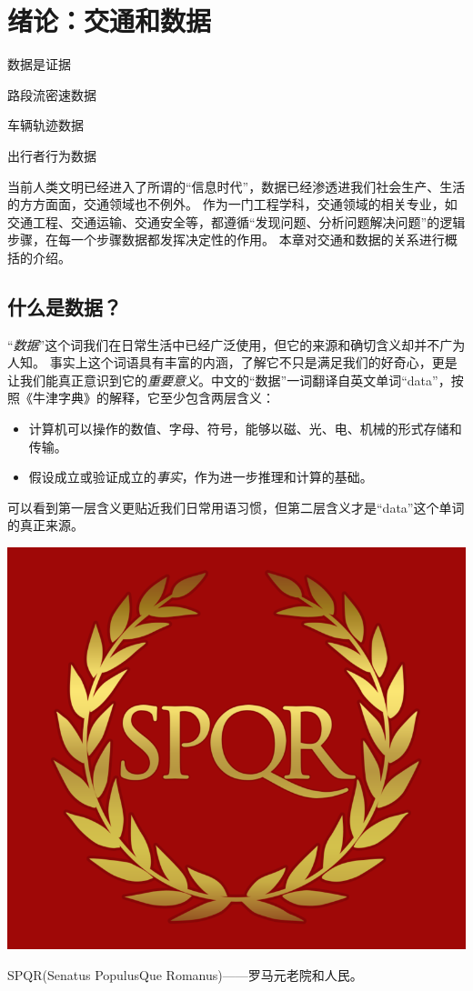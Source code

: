 
\chapter{绪论：交通和数据}
\begin{cabstract}
    \item 数据是证据
    \item 路段流密速数据
    \item 车辆轨迹数据
    \item 出行者行为数据
\end{cabstract}

当前人类文明已经进入了所谓的“信息时代”，数据已经渗透进我们社会生产、生活的方方面面，交通领域也不例外。
作为一门工程学科，交通领域的相关专业，如交通工程、交通运输、交通安全等，都遵循“发现问题、分析问题解决问题”的逻辑步骤，在每一个步骤数据都发挥决定性的作用。
本章对交通和数据的关系进行概括的介绍。

\section{什么是数据？}

“\emph{数据}”这个词我们在日常生活中已经广泛使用，但它的来源和确切含义却并不广为人知。
事实上这个词语具有丰富的内涵，了解它不只是满足我们的好奇心，更是让我们能真正意识到它的\emph{重要意义}。中文的“数据”一词翻译自英文单词“data”，按照《牛津字典》的解释，它至少包含两层含义：
\begin{itemize}
    \item 计算机可以操作的数值、字母、符号，能够以磁、光、电、机械的形式存储和传输。
    \item 假设成立或验证成立的\emph{事实}，作为进一步推理和计算的基础。
\end{itemize}
可以看到第一层含义更贴近我们日常用语习惯，但第二层含义才是“data”这个单词的真正来源。

\begin{marginfigure}
\includegraphics[width=\linewidth]{images/spqr.png}
\caption{SPQR(Senatus PopulusQue Romanus)——罗马元老院和人民。}
\end{marginfigure}

